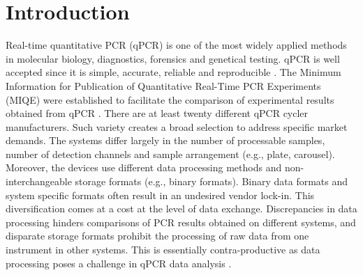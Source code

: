 \documentclass{bioinfo}
\begin{document}
\section{Introduction}
Real-time quantitative PCR (qPCR) is one of the most widely applied methods in molecular 
biology, diagnostics, forensics and genetical testing. qPCR is well accepted since 
it is simple, accurate, reliable and reproducible \cite{pabinger_2014}. The 
Minimum Information for Publication of Quantitative Real-Time PCR Experiments (MIQE) were established to facilitate the comparison of experimental results obtained from qPCR 
\cite{huggett_2013}. There are at least twenty different qPCR cycler manufacturers. Such variety creates a broad selection to 
address specific market demands. The systems differ largely in the 
number of processable samples, number of detection channels and sample 
arrangement (e.g., plate, carousel). Moreover, the devices use different 
data processing methods and non-interchangeable storage formats (e.g., binary formats). 
Binary data formats and system specific formats often result in an undesired vendor 
lock-in. This diversification comes at a cost at the level of data 
exchange. Discrepancies in data processing hinders comparisons of PCR results 
obtained on different systems, and disparate storage formats prohibit the processing 
of raw data from one instrument in other systems. This is essentially contra-productive as data processing poses a 
challenge in qPCR data analysis \cite{bustin_reproducibility_2014, roediger2015r, 
spiess_impact_2014, spiess_system-specific_2016}.
\end{document}
